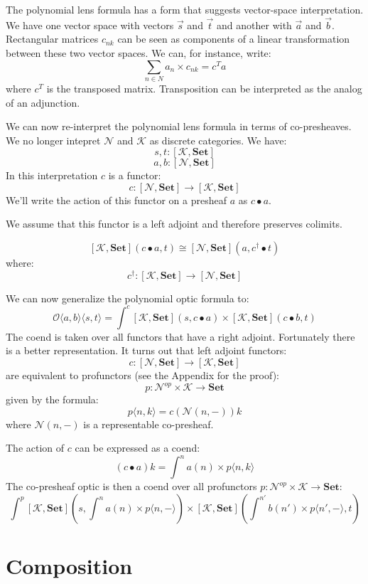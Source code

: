 \documentclass[11pt]{amsart}
\newcommand{\cat}[1]{\mathcal{#1}}%
\newcommand{\Cat}[1]{\mathbf{#1}}%
\newcommand{\Set}{\Cat{Set}}
\begin{document}
The polynomial lens formula has a form that suggests vector-space interpretation. We have one vector space with vectors $\vec{s}$ and $\vec{t}$ and another with $\vec{a}$ and $\vec{b}$. Rectangular matrices $c_{n k}$ can be seen as components of a linear transformation between these two vector spaces. We can, for instance, write:
\[  \sum_{n \in N} a_n \times c_{n k} = c^T a \]
where $c^T$ is the transposed matrix. Transposition can be interpreted as the analog of an adjunction. 

We can now re-interpret the polynomial lens formula in terms of co-presheaves. We no longer intepret $\cat N$ and $\cat K$ as discrete categories. We have:
\[ s, t \colon [\cat K, \Set] \]
\[a, b \colon [\cat N, \Set] \]
In this interpretation $c$ is a functor:
\[ c \colon [\cat N, \Set] \to [\cat K, \Set] \]
We'll write the action of this functor on a presheaf $a$ as $c \bullet a$.

We assume that this functor is a left adjoint and therefore preserves colimits. 

\[ [\cat K, \Set] (c \bullet a, t) \cong [\cat N, \Set] (a, c^{\dagger} \bullet t) \]
where:
\[ c^{\dagger} \colon [\cat K, \Set] \to [\cat N, \Set] \]

We can now generalize the polynomial optic formula to:
\[ \mathcal{O}\langle a, b\rangle \langle s, t \rangle = \int^{c} 
 [\cat K, \Set] \left(s,  c \bullet a \right) \times 
 [\cat K, \Set] \left(c \bullet b, t \right) \]
The coend is taken over all functors that have a right adjoint. Fortunately there is a better representation. It turns out that left adjoint functors:
\[ c \colon [\cat N, \Set] \to [\cat K, \Set] \]
are equivalent to profunctors (see the Appendix for the proof):
\[ p \colon \cat N^{op} \times \cat K \to \Set \]
given by the formula:
\[p \langle n, k \rangle = c ( \cat N(n, -)) k \]
where $\cat N(n, -)$ is a representable co-presheaf.

The action of $c$ can be expressed as a coend:
\[ (c \bullet a) k = \int^{n} a(n) \times p \langle n, k \rangle \]
The co-presheaf optic is then a coend over all profunctors $p \colon \cat N^{op} \times \cat K \to \Set$:
\[ \int^{p} 
 [\cat K, \Set] \left(s,  \int^{n} a(n) \times p \langle n, - \rangle \right) \times 
 [\cat K, \Set] \left(\int^{n'} b(n') \times p \langle n', - \rangle, t \right) \]
 
 \section{Composition}
 
\end{document}
